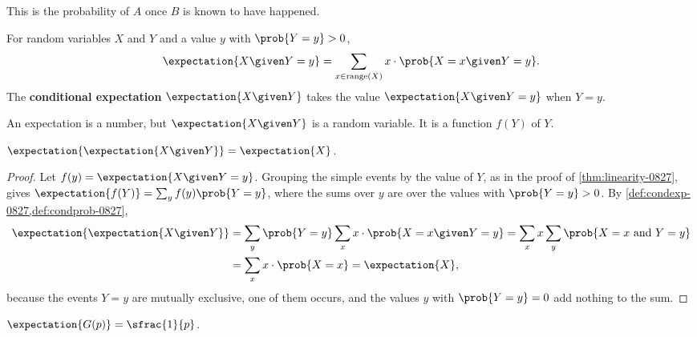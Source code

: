 This is the probability of $A$ once $B$ is known to have happened.

\begin{definition}\label{def:condexp-0827}
    For random variables $X$ and $Y$ and a value $y$ with $\prob{Y = y} > 0$,
    \[\expectation{X \given Y = y} = \sum_{x \in \operatorname{range}(X)} x \cdot \prob{X = x \given Y = y}.\]
    The \textbf{conditional expectation} $\expectation{X \given Y}$ takes the value
    $\expectation{X \given Y = y}$ when $Y = y$.
\end{definition}

An expectation is a number, but $\expectation{X \given Y}$ is a random variable. It is a function
$f(Y)$ of $Y$.

\begin{theorem}\label{thm:tower-0827}
    $\expectation{\expectation{X \given Y}} = \expectation{X}$.
\end{theorem}

\begin{proof}
    Let $f(y) = \expectation{X \given Y = y}$. Grouping the simple events by the value of $Y$, as in
    the proof of \cref{thm:linearity-0827}, gives
    $\expectation{f(Y)} = \sum_{y} f(y) \prob{Y = y}$, where the sums over $y$ are over the values
    with $\prob{Y = y} > 0$. By \cref{def:condexp-0827,def:condprob-0827},
    \begin{align*}
        \expectation{\expectation{X \given Y}}
         & = \sum_{y} \prob{Y = y} \sum_{x} x \cdot \prob{X = x \given Y = y}
        = \sum_{x} x \sum_{y} \prob{X = x \text{ and } Y = y}                  \\
         & = \sum_{x} x \cdot \prob{X = x} = \expectation{X},
    \end{align*}
    because the events $Y = y$ are mutually exclusive, one of them occurs, and the values $y$ with
    $\prob{Y = y} = 0$ add nothing to the sum.
\end{proof}

\begin{theorem}\label{thm:geometric-0827}
    $\expectation{G(p)} = \sfrac{1}{p}$.
\end{theorem}

